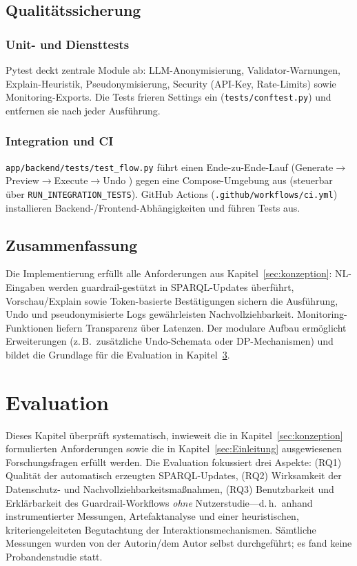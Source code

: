\section{Qualitätssicherung}

\subsection{Unit- und Diensttests}
Pytest deckt zentrale Module ab: LLM-Anonymisierung, Validator-Warnungen, Explain-Heuristik, Pseudonymisierung, Security (API-Key, Rate-Limits) sowie Monitoring-Exports. Die Tests frieren Settings ein (\texttt{tests/conftest.py}) und entfernen sie nach jeder Ausführung.

\subsection{Integration und CI}
\texttt{app/backend/tests/test\_flow.py} führt einen Ende-zu-Ende-Lauf (Generate\allowbreak$\rightarrow$\allowbreak Preview\allowbreak$\rightarrow$\allowbreak Execute\allowbreak$\rightarrow$\allowbreak Undo
) gegen eine Compose-Umgebung aus (steuerbar über \texttt{RUN\_INTEGRATION\_TESTS}). GitHub Actions (\texttt{.github/workflows/ci.yml}) installieren Backend-/Frontend-Abhängigkeiten und führen Tests aus.

\section{Zusammenfassung}
Die Implementierung erfüllt alle Anforderungen aus Kapitel~\ref{sec:konzeption}: NL-Eingaben werden guardrail-gestützt in SPARQL-Updates überführt, Vorschau/Explain sowie Token-basierte Bestätigungen sichern die Ausführung, Undo und pseudonymisierte Logs gewährleisten Nachvollziehbarkeit. Monitoring-Funktionen liefern Transparenz über Latenzen. Der modulare Aufbau ermöglicht Erweiterungen (z.\,B.\ zusätzliche Undo-Schemata oder DP-Mechanismen) und bildet die Grundlage für die Evaluation in Kapitel~\ref{sec:evaluation}.







\chapter{Evaluation}
\label{sec:evaluation}

Dieses Kapitel überprüft systematisch, inwieweit die in Kapitel~\ref{sec:konzeption} formulierten Anforderungen sowie die in Kapitel~\ref{sec:Einleitung} ausgewiesenen Forschungsfragen erfüllt werden. Die Evaluation fokussiert drei Aspekte: (RQ1) Qualität der automatisch erzeugten SPARQL-Updates, (RQ2) Wirksamkeit der Datenschutz- und Nachvollziehbarkeitsmaßnahmen, (RQ3) Benutzbarkeit und Erklärbarkeit des Guardrail-Workflows \emph{ohne} Nutzerstudie—d.\,h.\ anhand instrumentierter Messungen, Artefaktanalyse und einer heuristischen, kriteriengeleiteten Begutachtung der Interaktionsmechanismen. Sämtliche Messungen wurden von der Autorin/dem Autor selbst durchgeführt; es fand keine Probandenstudie statt.

